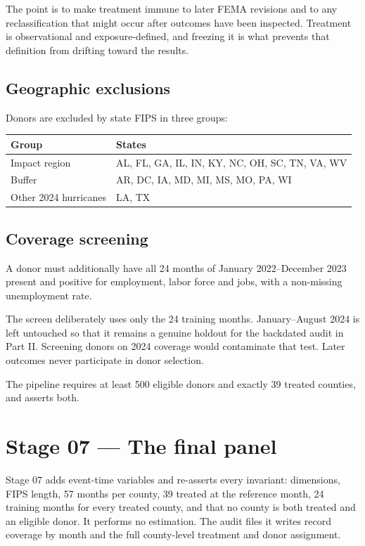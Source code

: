 \documentclass[11pt,a4paper]{article}
\newcommand{\caution}[2]{\begin{tcolorbox}[warnbox,title={#1}]#2\end{tcolorbox}}
\begin{document}
The point is to make treatment immune to later FEMA revisions and to any
reclassification that might occur after outcomes have been inspected. Treatment
is observational and exposure-defined, and freezing it is what prevents that
definition from drifting toward the results.

\subsection{Geographic exclusions}

Donors are excluded by state FIPS in three groups:

\begin{center}
\small
\begin{tabular}{@{}lp{9.2cm}@{}}
\toprule
\textbf{Group} & \textbf{States} \\
\midrule
Impact region & AL, FL, GA, IL, IN, KY, NC, OH, SC, TN, VA, WV \\
Buffer & AR, DC, IA, MD, MI, MS, MO, PA, WI \\
Other 2024 hurricanes & LA, TX \\
\bottomrule
\end{tabular}
\end{center}

\subsection{Coverage screening}

A donor must additionally have all 24 months of January 2022--December 2023
present and positive for employment, labor force and jobs, with a non-missing
unemployment rate.

\caution{Why the screen stops at December 2023}{%
The screen deliberately uses only the 24 training months. January--August 2024
is left untouched so that it remains a genuine holdout for the backdated audit
in Part II. Screening donors on 2024 coverage would contaminate that test.
Later outcomes never participate in donor selection.}

\noindent The pipeline requires at least 500 eligible donors and exactly 39
treated counties, and asserts both.

\section{Stage 07 --- The final panel}

Stage 07 adds event-time variables and re-asserts every invariant: dimensions,
FIPS length, 57 months per county, 39 treated at the reference month, 24
training months for every treated county, and that no county is both treated
and an eligible donor. It performs no estimation. The audit files it writes
record coverage by month and the full county-level treatment and donor
assignment.
\end{document}
